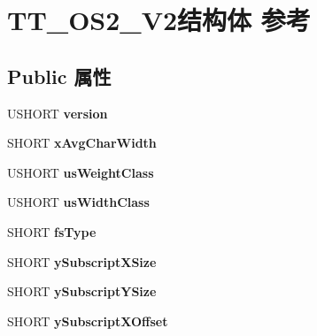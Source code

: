 \hypertarget{struct_t_t___o_s2___v2}{}\section{T\+T\+\_\+\+O\+S2\+\_\+\+V2结构体 参考}
\label{struct_t_t___o_s2___v2}
\subsection*{Public 属性}
\begin{DoxyCompactItemize}
\item 
\mbox{\label{struct_t_t___o_s2___v2_ae2297b701dd5c538e3278d873474922f}} 
U\+S\+H\+O\+RT {\bfseries version}
\item 
\mbox{\label{struct_t_t___o_s2___v2_a245a291c60398067d1b3f1642fd9dcd4}} 
S\+H\+O\+RT {\bfseries x\+Avg\+Char\+Width}
\item 
\mbox{\label{struct_t_t___o_s2___v2_a38cdf1236d39ad10d2bc3b5f9728beff}} 
U\+S\+H\+O\+RT {\bfseries us\+Weight\+Class}
\item 
\mbox{\label{struct_t_t___o_s2___v2_ac09aff77e8af3796713ab53d3c95eaae}} 
U\+S\+H\+O\+RT {\bfseries us\+Width\+Class}
\item 
\mbox{\label{struct_t_t___o_s2___v2_a0eb00d39aa3bd203c9d18c04c5ee032d}} 
S\+H\+O\+RT {\bfseries fs\+Type}
\item 
\mbox{\label{struct_t_t___o_s2___v2_a7e87c5cba47e5f43e19371cf0196e9c1}} 
S\+H\+O\+RT {\bfseries y\+Subscript\+X\+Size}
\item 
\mbox{\label{struct_t_t___o_s2___v2_a165f7e26c68e99c515714650705196bb}} 
S\+H\+O\+RT {\bfseries y\+Subscript\+Y\+Size}
\item 
\mbox{\label{struct_t_t___o_s2___v2_a3d358678001c7c72cf49b7ad227a02b0}} 
S\+H\+O\+RT {\bfseries y\+Subscript\+X\+Offset}
\item 
\mbox{\label{struct_t_t___o_s2___v2_afb99719266f6cabaa2f90b50b7754b6d}} 

\end{DoxyCompactItemize}
